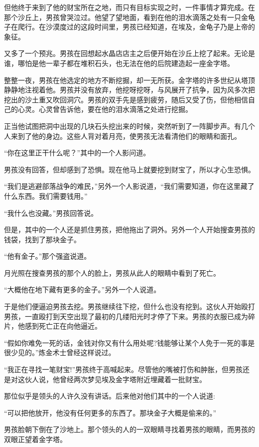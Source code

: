 \documentclass[twoside,openany]{book}
\begin{document}
但他终于来到了他的财宝所在之地，而只有目标实现之时，一件事情才算完成。在那个沙丘上，男孩曾哭泣过。他望了望地面，看到在他的泪水滴落之处有一只金龟子在爬行。在沙漠度过的这段时间里，男孩已经知道，在埃及，金龟子乃是上帝的象征。

又多了一个预兆。男孩在回想起水晶店店主之后便开始在沙丘上挖了起来。无论是谁，哪怕是他一辈子都在堆积石头，也无法在他的后院建造起一座金字塔。

整整一夜，男孩在他选定的地方不断挖掘，却一无所获。金字塔的许多世纪从塔顶静静地注视着他。男孩并没有放弃，他挖呀挖呀，与风展开了抗争，因为风多次把挖出的沙土重又吹回洞穴。男孩的双手先是感到疲劳，随后又受了伤，但他相信自己的心灵。心灵曾告诉他，要在他的泪水滴落之处进行挖掘。

正当他试图把洞中出现的几块石头挖出来的时候，突然听到了一阵脚步声。有几个人来到了他的身边。这些人背对着月亮，使男孩无法看清他们的眼睛和面孔。

“你在这里正干什么呢？”其中的一个人影问道。

男孩没有回答，但却感到了恐惧。现在他马上就要挖到财宝了，所以才心生恐惧。

“我们是逃避部落战争的难民，”另外一个人影说道，“我们需要知道，你在这里藏了什么东西。我们需要钱用。”

“我什么也没藏。”男孩回答说。

但是，其中的一个人还是抓住男孩，把他拖出了洞外。另外一个人开始搜查男孩的钱袋，找到了那块金子。

“他有金子。”那个强盗说道。

月光照在搜查男孩的那个人的脸上，男孩从此人的眼睛中看到了死亡。

“大概他在地下藏有更多的金子。”另外一个人说道。

于是他们便逼迫男孩去挖。男孩继续往下挖，但什么也没有挖到。这伙人开始殴打男孩，一直殴打到天空出现了最初的几缕阳光时才停了下来。男孩的衣服已成为碎片，他感到死亡正在向他逼近。

“假如你难免一死的话，金钱对你又有什么用处呢?钱能够让某个人免于一死的事是很少见的。”炼金术士曾经这样说过。

“我正在寻找一笔财宝!”男孩终于高喊起来。尽管他的嘴被打伤和肿胀，但男孩还是对这伙人说，他曾经两次梦见埃及金字塔附近埋藏着一批财宝。

那位似乎是领头的人许久没有讲话。后来他对他们其中的一个人说道:

“可以把他放开，他没有任何更多的东西了。那块金子大概是偷来的。”

男孩脸朝下倒在了沙地上。那个领头的人的一双眼睛寻找着男孩的眼睛，而男孩的双眼正望着金字塔。
\end{document}
